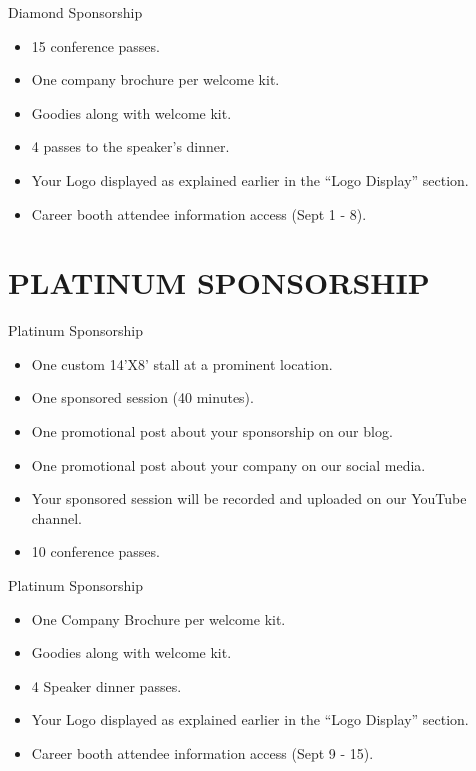 \documentclass[10pt, compress, aspectratio=169]{beamer}
\begin{document}
\begin{frame}{Diamond Sponsorship}
\begin{itemize}
    \item 15 conference passes.
\item One company brochure per welcome kit.
\item Goodies along with welcome kit.
\item 4 passes to the speaker’s dinner.
\item Your Logo displayed as explained earlier in the “Logo Display” section.
\item Career booth attendee information access (Sept 1 - 8).
\end{itemize}
\end{frame}

\section{PLATINUM SPONSORSHIP}
\begin{frame}{Platinum Sponsorship}
\begin{itemize}
\item One custom 14’X8’ stall at a prominent location.    
\item One sponsored session (40 minutes).    
\item One promotional post about your sponsorship on our blog.
\item One promotional post about your company on our social media.
\item Your sponsored session will be recorded and uploaded on our YouTube channel.
\item 10 conference passes.
\end{itemize}
\end{frame}

\begin{frame}{Platinum Sponsorship}
    \begin{itemize}
        \item One Company Brochure per welcome kit.
        \item Goodies along with welcome kit.
        \item 4 Speaker dinner passes.
        \item Your Logo displayed as explained earlier in the “Logo Display” section.
        \item Career booth attendee information access (Sept 9 - 15).
    \end{itemize}
\end{frame}
\end{document}
